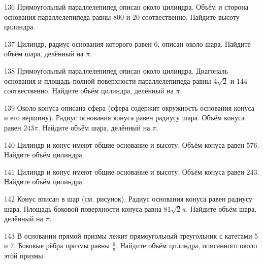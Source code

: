 \documentclass[4apaper]{article}
\begin{document}
\begin{taskBN}{136}
Прямоугольный параллелепипед описан около цилиндра. Объём и сторона основания параллелепипеда равны $800$ и $20$ соотвественно. Найдите высоту цилиндра.
\end{taskBN}

\begin{taskBN}{137}
 Цилиндр, радиус основания которого равен $6$, описан около шара. Найдите объём шара, делённый на $\pi$.
\end{taskBN}

\begin{taskBN}{138}
Прямоугольный параллелепипед описан около цилиндра. Диагональ основания и площадь полной поверхности параллелепипеда равны $4\sqrt{2}$ и $144$ соотвественно. Найдите объём цилиндра, делённый на $\pi$.
\end{taskBN}

\begin{taskBN}{139}
Около конуса описана сфера (сфера содержит окружность основания конуса и его вершину).  Радиус основания конуса равен радиусу шара. Объём конуса равен $243\pi$. Найдите объём шара, делённый на $\pi$.
\end{taskBN}

\begin{taskBN}{140}
Цилиндр и конус имеют общие основание и высоту. Объём конуса равен $576$. Найдите объём цилиндра.
\end{taskBN}

\begin{taskBN}{141}
Цилиндр и конус имеют общие основание и высоту. Объём конуса равен $243$. Найдите объём цилиндра.
\end{taskBN}

\begin{taskBN}{142}
Конус вписан в шар (см. рисунок).  Радиус основания конуса равен радиусу шара. Площадь боковой поверхности конуса равна $81\sqrt{2}\pi$. Найдите объём шара, делённый на $\pi$.
\end{taskBN}

\begin{taskBN}{143}
В основании прямой призмы лежит прямоугольный треугольник с катетами $5$ и $7$. Боковые рёбра призмы равны $\frac{6}{\pi}$. Найдите объём цилиндра, описанного около этой призмы.
\end{taskBN}
\end{document}

